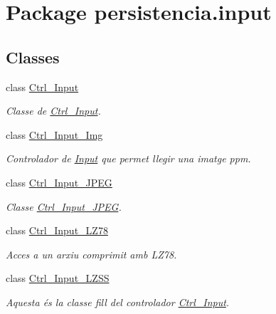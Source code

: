 \hypertarget{namespacepersistencia_1_1input}{}\section{Package persistencia.\+input}
\label{namespacepersistencia_1_1input}
\subsection*{Classes}
\begin{DoxyCompactItemize}
\item 
class \hyperlink{classpersistencia_1_1input_1_1Ctrl__Input}{Ctrl\+\_\+\+Input}
\begin{DoxyCompactList}\small\item\em Classe de \hyperlink{classpersistencia_1_1input_1_1Ctrl__Input}{Ctrl\+\_\+\+Input}. \end{DoxyCompactList}\item 
class \hyperlink{classpersistencia_1_1input_1_1Ctrl__Input__Img}{Ctrl\+\_\+\+Input\+\_\+\+Img}
\begin{DoxyCompactList}\small\item\em Controlador de \hyperlink{classpersistencia_1_1input_1_1Input}{Input} que permet llegir una imatge ppm. \end{DoxyCompactList}\item 
class \hyperlink{classpersistencia_1_1input_1_1Ctrl__Input__JPEG}{Ctrl\+\_\+\+Input\+\_\+\+J\+P\+EG}
\begin{DoxyCompactList}\small\item\em Classe \hyperlink{classpersistencia_1_1input_1_1Ctrl__Input__JPEG}{Ctrl\+\_\+\+Input\+\_\+\+J\+P\+EG}. \end{DoxyCompactList}\item 
class \hyperlink{classpersistencia_1_1input_1_1Ctrl__Input__LZ78}{Ctrl\+\_\+\+Input\+\_\+\+L\+Z78}
\begin{DoxyCompactList}\small\item\em Acces a un arxiu comprimit amb L\+Z78. \end{DoxyCompactList}\item 
class \hyperlink{classpersistencia_1_1input_1_1Ctrl__Input__LZSS}{Ctrl\+\_\+\+Input\+\_\+\+L\+Z\+SS}
\begin{DoxyCompactList}\small\item\em Aquesta és la classe fill del controlador \hyperlink{classpersistencia_1_1input_1_1Ctrl__Input}{Ctrl\+\_\+\+Input}. \end{DoxyCompactList}\item 

\end{DoxyCompactItemize}
